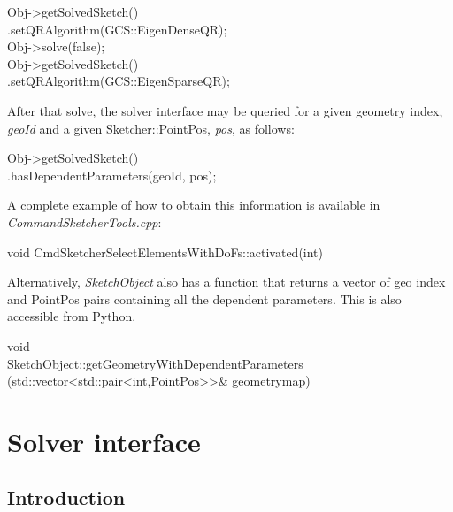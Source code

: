 \documentclass[12pt,twoside,a4paper]{book}
\newcommand{\SketchObject}{\emph{SketchObject}}
\begin{document}
    \begin{codequote}
        Obj-\textgreater{}getSolvedSketch()\\
        \-\hspace{1cm}.setQRAlgorithm(GCS::EigenDenseQR);\\
        Obj-\textgreater{}solve(false);\\
        Obj-\textgreater{}getSolvedSketch()\\
        \-\hspace{1cm}.setQRAlgorithm(GCS::EigenSparseQR);
    \end{codequote}

    After that solve, the solver interface may be queried for a given geometry index, \emph{geoId} and a given Sketcher::PointPos, \emph{pos}, as follows:

    \begin{codequote}
        Obj-\textgreater{}getSolvedSketch()\\
        \-\hspace{1cm}.hasDependentParameters(geoId, pos);
    \end{codequote}

    A complete example of how to obtain this information is available in \emph{CommandSketcherTools.cpp}:

    \begin{codequote}
    void CmdSketcherSelectElementsWithDoFs::activated(int)
    \end{codequote}

    Alternatively, \SketchObject{} also has a function that returns a vector of geo index and PointPos pairs containing all the dependent parameters. This is also accessible from Python.

    \begin{codequote}
    void\\ SketchObject::getGeometryWithDependentParameters\\
    \-\hspace{0.75cm}(std::vector\textless{}std::pair\textless{}int,PointPos\textgreater{}\textgreater{}\& geometrymap)
    \end{codequote}

    \chapter{Solver interface}

    \section{Introduction}
\end{document}
